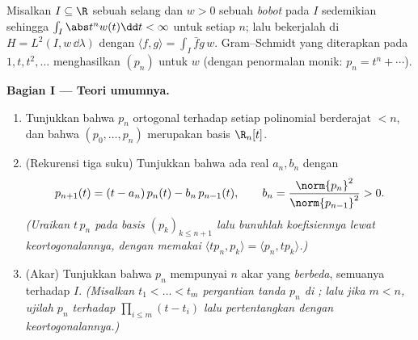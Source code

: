 \begin{problem}\label{pb:b3:hilbert:1}
Misalkan $I \subseteq \R$ sebuah selang dan $w > 0$ sebuah
\emph{bobot}  pada  $I$ sedemikian sehingga $\int_I
\abs t^nw(t)\dd t < \infty$ untuk setiap $n$; lalu bekerjalah di $H = L^2(I,
w\,\dd\lambda)$ dengan $\langle f, g\rangle = \int_I \bar
fg\,w$. Gram--Schmidt yang diterapkan pada $1, t, t^2, \dots$ menghasilkan
\emph{} $(p_n)$ untuk $w$ (dengan penormalan
monik: $p_n = t^n + \cdots$).

\medskip
\noindent\textbf{Bagian I --- Teori umumnya.}
\begin{enumerate}
  \item Tunjukkan bahwa $p_n$ ortogonal terhadap setiap polinomial berderajat
        $< n$, dan bahwa $(p_0, \dots, p_n)$ merupakan basis
        $\R_n[t]$.
  \item (Rekurensi tiga suku) Tunjukkan bahwa ada real $a_n,
        b_n$ dengan
        \[
        p_{n+1}(t) = (t - a_n)\,p_n(t) - b_n\,p_{n-1}(t),
        \qquad b_n = \frac{\norm{p_n}^2}{\norm{p_{n-1}}^2} >
        0 .
        \]
        \emph{(Uraikan $t\,p_n$ pada basis $(p_k)_{k \leq
        n+1}$ lalu bunuhlah koefisiennya lewat keortogonalannya, dengan memakai
        $\langle tp_n, p_k\rangle = \langle p_n,
        tp_k\rangle$.)}
  \item (Akar) Tunjukkan bahwa $p_n$ mempunyai $n$ akar yang \emph{berbeda},
        semuanya  terhadap $I$. \emph{(Misalkan $t_1 < \dots < t_m$
        pergantian tanda $p_n$ di ; lalu jika $m < n$,
        ujilah $p_n$ terhadap $\prod_{i\leq m}(t - t_i)$ lalu
        pertentangkan dengan keortogonalannya.)}
\end{enumerate}


\end{problem}
